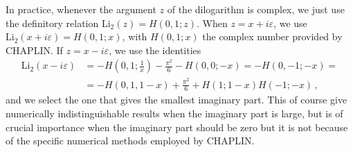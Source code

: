 \documentclass[12pt]{article}
\begin{document}
In practice, whenever the argument $z$ of the dilogarithm is complex, we just use the
definitory relation $\mathrm{Li_2}(z)=H(0,1;z)$. When $z=x+i\varepsilon$, we use $\mathrm{Li_2}(x+i\varepsilon)=H(0,1;x)$, with $H(0,1;x)$ the complex number provided by CHAPLIN. If $z=x-i\varepsilon$, we use the identities
\begin{equation}
  \begin{split}
\mathrm{Li}_{2}\left ( x-i\varepsilon \right )&= -H\left(0,1;\frac{1}{x} \right ) - \frac{\pi^2}{6} - H(0,0; -x)  = -H(0,-1;-x) = \\ & 
= -H\left (0,1, 1-x \right )+ \frac{\pi^2}{6} + H(1;1-x) H(-1;-x)\,,
  \end{split}
\end{equation}
and we select the one that gives the smallest imaginary part. This of course give numerically indistinguishable results when the imaginary part is large, but is of
crucial importance when the imaginary part should be zero but it is
not because of the specific numerical methods employed by CHAPLIN.



%


\end{document}

